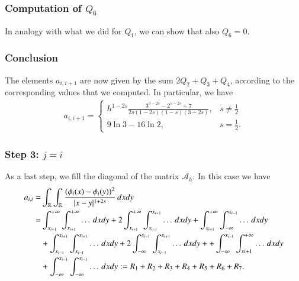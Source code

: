 \subsubsection*{Computation of $Q_6$}
In analogy with what we did for $Q_1$, we can show that also $Q_6=0$.

\subsubsection*{Conclusion}
The elements $a_{i,i+1}$ are now given by the sum $2Q_2+Q_3+Q_4$, according to the corresponding values that we computed. In particular, we have
\begin{align}\label{Aii1}
	a_{i,i+1} = \begin{cases}
					\displaystyle h^{1-2s}\frac{3^{3-2s}-2^{5-2s}+7}{2s(1-2s)(1-s)(3-2s)}, & \displaystyle s\neq \frac{1}{2}
					\\
					9\ln 3-16\ln 2, & \displaystyle s=\frac{1}{2}.
				\end{cases}	
\end{align}

\subsubsection*{Step 3: $j= i$}
As a last step, we fill the diagonal of the matrix $\mathcal A_h$. In this case we have
	\begin{align*}
	a_{i,i}= & \int_{\mathbb{R}}\int_{\mathbb{R}}\frac{(\phi_i(x)-\phi_i(y))^2}{|x-y|^{1+2s}}\,dxdy
	\\
	= & \int_{x_{i+1}}^{+\infty}\int_{x_{i+1}}^{+\infty} \ldots\,dxdy + 2\int_{x_{i+1}}^{+\infty}\int_{x_{i-1}}^{x_{i+1}} \ldots\,dxdy + \int_{x_{i+1}}^{+\infty}\int_{-\infty}^{x_{i-1}} \ldots\,dxdy 
	\\
	& + \int_{x_{i-1}}^{x_{i+1}}\int_{x_{i-1}}^{x_{i+1}} \ldots\,dxdy + 2\int_{-\infty}^{x_{i-1}}\int_{x_{i-1}}^{x_{i+1}} \ldots\,dxdy + + \int_{-\infty}^{x_{i-1}}\int_{x{i+1}}^{+\infty} \ldots\,dxdy 
	\\
	& +  \int_{-\infty}^{x_{i-1}}\int_{-\infty}^{x_{i-1}} \ldots\,dxdy := R_1 + R_2 + R_3 + R_4 + R_5 + R_6 + R_7.
\end{align*}

